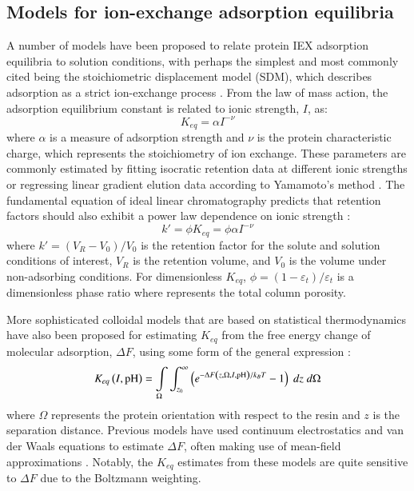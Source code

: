 \documentclass[preprint,review,12pt]{elsarticle}
\providecommand{\DIFaddtex}[1]{{\protect\color{blue}\uwave{#1}}} %
\providecommand{\DIFaddbegin}{} %
\providecommand{\DIFaddend}{} %
\providecommand{\DIFdelbegin}{} %
\providecommand{\DIFdelend}{} %
\providecommand{\DIFadd}[1]{\texorpdfstring{\DIFaddtex{#1}}{#1}} %
\providecommand{\DIFdel}[1]{} %
\begin{document}
    \subsection{Models for ion-exchange adsorption equilibria} \label{ssec:electrostatics}
        A number of models have been proposed to relate protein IEX adsorption equilibria to solution conditions, with perhaps the simplest and most commonly cited being the stoichiometric displacement model (SDM), which describes adsorption as a strict ion-exchange process \cite{Boardman1955}. From the law of mass action, the adsorption equilibrium constant is related to ionic strength, $I$, as:
        \begin{equation} \label{eq:sdm}
            K_{eq} = \alpha I^{-\nu}
        \end{equation}
        where $\alpha$ is a measure of adsorption strength and $\nu$ is the protein characteristic charge, which represents the stoichiometry of ion exchange. These parameters are commonly estimated by fitting isocratic retention data at different ionic strengths or regressing linear gradient elution data according to Yamamoto's method \cite{Yamamoto1987}. The fundamental equation of ideal linear chromatography predicts that retention factors should also exhibit a power law dependence on ionic strength \cite{Guiochon2006}:
        \begin{equation} \label{eq:fundamental}
            k' = \phi K_{eq} = \phi \alpha I^{-\nu}
        \end{equation}
        where $k' = (V_R - V_0)/V_0$ is the retention factor for the solute and solution conditions of interest, $V_R$ is the retention volume, and $V_0$ is the \DIFdelbegin \DIFdel{flow-through }\DIFdelend \DIFaddbegin \DIFadd{retention }\DIFaddend volume under non-adsorbing conditions. For dimensionless $K_{eq}$, $\phi = (1 - \varepsilon_t)/\varepsilon_t$ is a dimensionless phase ratio where \DIFdelbegin \DIFdel{$\varepsilon_t = \varepsilon_c + (1 - \varepsilon_c) \varepsilon_p$ }\DIFdelend \DIFaddbegin \DIFadd{$\varepsilon_t = \varepsilon_c + (1 - \varepsilon_c) \varepsilon_p = V_0/V_{column}$ }\DIFaddend represents the total column porosity.

        More sophisticated colloidal models that are based on statistical thermodynamics have also been proposed for estimating $K_{eq}$ from the free energy change of molecular adsorption, $\Delta F$, using some form of the general expression \cite{Asthagiri1997}:
        \begin{equation} \label{eq:keq stat thermo}
            K_{eq}\left(I, \mathrm{pH} \right) = \int \displaylimits_\Omega \int_{z_0}^{\infty} \left( e^{-\Delta F \left( z, \Omega, I, \mathrm{pH} \right)/k_BT} - 1 \right) \; dz \; d\Omega
        \end{equation}
        where $\Omega$ represents the protein orientation with respect to the resin and $z$ is the separation distance. Previous models have used continuum electrostatics and van der Waals equations to estimate $\Delta F$, often making use of mean-field approximations \cite{Guelat2012, Briskot2019}. Notably, the $K_{eq}$ estimates from these models are quite sensitive to $\Delta F$ due to the Boltzmann weighting.
\end{document}
